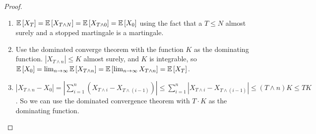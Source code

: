 \documentclass[english, course]{Notes}
\begin{document}
\begin{proof}
\begin{enumerate}
	\item $\mathbb{E}\left[X_T\right] = \mathbb{E}\left[X_{T \wedge N}\right] = \mathbb{E}\left[X_{T \wedge 0}\right] = \mathbb{E}\left[X_0\right]$ using the fact that a $T \leq N$ almost surely and a stopped martingale is a martingale.
	\item Use the dominated converge theorem with the function $K$ as the dominating function. $|X_{T \wedge n}| \leq K$ almost surely, and $K$ is integrable, so $\mathbb{E}\left[X_0\right] = \lim_{n \to \infty} \mathbb{E}\left[X_{T \wedge n}\right] = \mathbb{E}\left[\lim_{n \to \infty} X_{T \wedge n}\right] = \mathbb{E}\left[X_T\right]$. 
	\item $|X_{T \wedge n} - X_0| = |\sum_{i = 1}^n (X_{T \wedge i} - X_{T \wedge (i-1)})| \leq \sum_{i = 1}^n |X_{T \wedge i} - X_{T \wedge (i-1)}| \leq (T \wedge n) K \leq TK$. So we can use the dominated convergence theorem with $T \cdot K$ as the dominating function.
\end{enumerate}
\end{proof}
\end{document}
